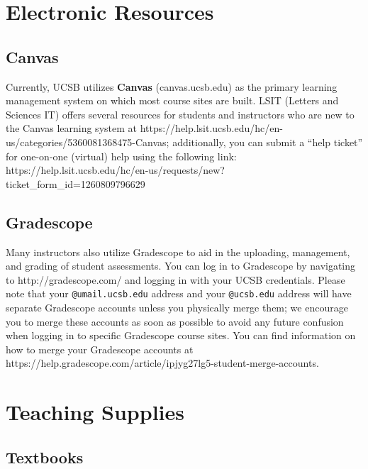 \documentclass[
  letterpaper,
  DIV=11,
  numbers=noendperiod]{scrreprt}
\begin{document}
\hypertarget{electronic-resources}{%
\chapter{Electronic Resources}\label{electronic-resources}}

\hypertarget{canvas}{%
\section{Canvas}\label{canvas}}

Currently, UCSB utilizes \textbf{Canvas} (canvas.ucsb.edu) as the
primary learning management system on which most course sites are built.
LSIT (Letters and Sciences IT) offers several resources for students and
instructors who are new to the Canvas learning system at
https://help.lsit.ucsb.edu/hc/en-us/categories/5360081368475-Canvas;
additionally, you can submit a ``help ticket'' for one-on-one (virtual)
help using the following link:
https://help.lsit.ucsb.edu/hc/en-us/requests/new?ticket\_form\_id=1260809796629

\hypertarget{gradescope}{%
\section{Gradescope}\label{gradescope}}

Many instructors also utilize Gradescope to aid in the uploading,
management, and grading of student assessments. You can log in to
Gradescope by navigating to http://gradescope.com/ and logging in with
your UCSB credentials. Please note that your \texttt{@umail.ucsb.edu}
address and your \texttt{@ucsb.edu} address will have separate
Gradescope accounts unless you physically merge them; we encourage you
to merge these accounts as soon as possible to avoid any future
confusion when logging in to specific Gradescope course sites. You can
find information on how to merge your Gradescope accounts at
https://help.gradescope.com/article/ipjyg27lg5-student-merge-accounts.

\hypertarget{teaching-supplies}{%
\chapter{Teaching Supplies}\label{teaching-supplies}}

\hypertarget{textbooks}{%
\section{Textbooks}\label{textbooks}}
\end{document}
